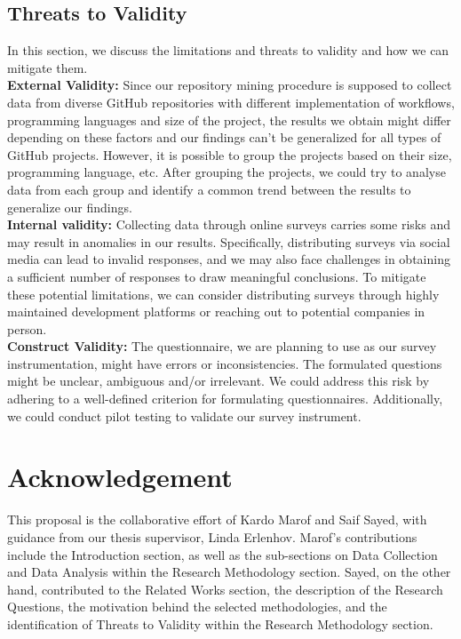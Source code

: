 \documentclass[conference]{IEEEtran}
\begin{document}
    \subsection{Threats to Validity}
        In this section, we discuss the limitations and threats to
        validity and how we can mitigate them.\\

        \textbf{External Validity:} Since our repository mining procedure is supposed to collect data from diverse GitHub repositories with different implementation of workflows, programming languages and size of the project, the results we obtain might differ depending on these factors and our findings can’t be generalized for all types of GitHub projects. However, it is possible to group the projects based on their size, programming language, etc. After grouping the projects, we could try to analyse data from each group and identify a common trend between the results to generalize our findings.\\

        \textbf{Internal validity:} Collecting data through online surveys carries some risks and may result in anomalies in our results. Specifically, distributing surveys via social media can lead to invalid responses, and we may also face challenges in obtaining a sufficient number of responses to draw meaningful conclusions. To mitigate these potential limitations, we can consider distributing surveys through highly maintained development platforms or reaching out to potential companies in person. \\

	\textbf{Construct Validity:} The questionnaire, we are planning to use as our survey instrumentation, might have errors or inconsistencies. The formulated questions might be unclear, ambiguous and/or irrelevant. We could address this risk by adhering to a well-defined criterion for formulating questionnaires. Additionally, we could conduct pilot testing to validate our survey instrument.


\section{Acknowledgement}

         This proposal is the collaborative effort of Kardo Marof and Saif Sayed, with guidance from our thesis supervisor, Linda Erlenhov. Marof's contributions include the Introduction section, as well as the sub-sections on Data Collection and Data Analysis within the Research Methodology section. Sayed, on the other hand, contributed to the Related Works section, the description of the Research Questions, the motivation behind the selected methodologies, and the identification of Threats to Validity within the Research Methodology section.






\vspace{12pt}
\end{document}
